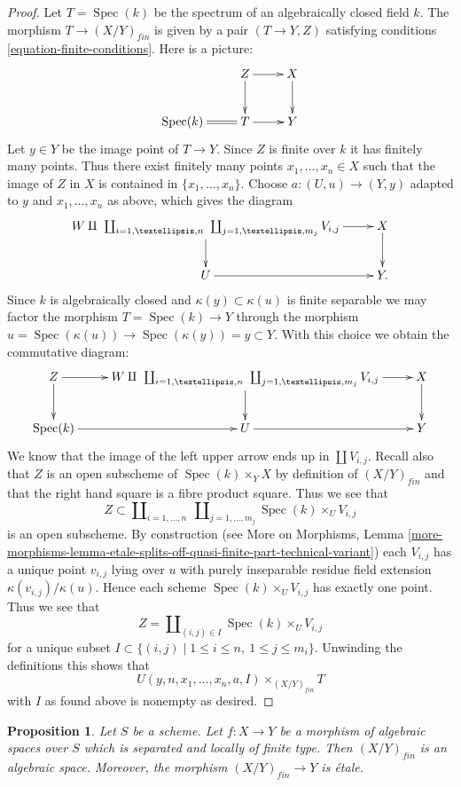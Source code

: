 \documentclass{stacks-project}
\theoremstyle{plain}
\newtheorem{proposition}[subsection]{Proposition}
\theoremstyle{definition}
\theoremstyle{remark}
\numberwithin{equation}{subsection}
\def\Spec{\mathop{\mathrm{Spec}}}
\begin{document}
\begin{proof}
\medskip\noindent
Let $T = \Spec(k)$ be the spectrum of an algebraically closed
field $k$. The morphism $T \to (X/Y)_{fin}$ is given by a pair
$(T \to Y, Z)$ satisfying conditions \ref{equation-finite-conditions}.
Here is a picture:
$$
\xymatrix{
& Z \ar[d] \ar[r] & X \ar[d] \\
\Spec(k) \ar@{=}[r] & T \ar[r] & Y
}
$$
Let $y \in Y$ be the image point of $T \to Y$.
Since $Z$ is finite over $k$ it has finitely many points.
Thus there exist finitely many points $x_1, \ldots, x_n \in X$
such that the image of $Z$ in $X$ is contained in $\{x_1, \ldots, x_n\}$.
Choose $a : (U, u) \to (Y, y)$ adapted to $y$ and $x_1, \ldots, x_n$ as
above, which gives the diagram
$$
\xymatrix{
W \amalg
\ \coprod\nolimits_{i = 1, \ldots, n}
\ \coprod\nolimits_{j = 1, \ldots, m_j}
V_{i, j} \ar[d] \ar[r] &
X \ar[d] \\
U \ar[r] & Y.
}
$$
Since $k$ is algebraically closed and
$\kappa(y) \subset \kappa(u)$ is finite separable
we may factor the morphism
$T = \Spec(k) \to Y$ through the morphism
$u = \Spec(\kappa(u)) \to \Spec(\kappa(y)) = y \subset Y$.
With this choice we obtain the commutative diagram:
$$
\xymatrix{
Z \ar[d] \ar[r] &
W \amalg
\ \coprod\nolimits_{i = 1, \ldots, n}
\ \coprod\nolimits_{j = 1, \ldots, m_j}
V_{i, j} \ar[d] \ar[r] &
X \ar[d] \\
\Spec(k) \ar[r] &
U \ar[r] & Y
}
$$
We know that the image of the left upper arrow ends up in
$\coprod V_{i, j}$. Recall also that $Z$ is an open subscheme
of $\Spec(k) \times_Y X$ by definition of $(X/Y)_{fin}$
and that the right hand square is a fibre product square.
Thus we see that
$$
Z \subset
\coprod\nolimits_{i = 1, \ldots, n}\ \coprod\nolimits_{j = 1, \ldots, m_j}
\Spec(k) \times_U V_{i, j}
$$
is an open subscheme. By construction (see
More on Morphisms, Lemma
\ref{more-morphisms-lemma-etale-splits-off-quasi-finite-part-technical-variant})
each $V_{i, j}$ has a unique point $v_{i, j}$ lying over $u$
with purely inseparable residue field extension
$\kappa(v_{i, j})/\kappa(u)$. Hence each
scheme $\Spec(k) \times_U V_{i, j}$ has exactly one
point. Thus we see that
$$
Z = \coprod\nolimits_{(i, j) \in I} \Spec(k) \times_U V_{i, j}
$$
for a unique subset
$I \subset \{(i, j) \mid 1 \leq i \leq n, \ 1 \leq j \leq m_i\}$.
Unwinding the definitions this shows that
$$
U(y, n, x_1, \ldots, x_n, a, I) \times_{(X/Y)_{fin}} T
$$
with $I$ as found above is nonempty as desired.
\end{proof}

\begin{proposition}
\label{proposition-finite-algebraic-space}
Let $S$ be a scheme.
Let $f : X \to Y$ be a morphism of algebraic spaces over $S$ which
is separated and locally of finite type. Then $(X/Y)_{fin}$
is an algebraic space. Moreover, the morphism
$(X/Y)_{fin} \to Y$ is \'etale.
\end{proposition}
\end{document}
